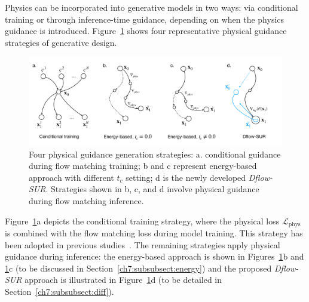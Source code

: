 Physics can be incorporated into generative models in two ways: via conditional training or through inference-time guidance, depending on when the physics guidance is introduced. Figure~\ref{ch7:fig:fmStrategy} shows four representative physical guidance strategies of generative design.  
\begin{figure}[htbp]
    \centering
    \includegraphics[width=1.0\linewidth]{chapter7/fig/Gen_paper.pdf}
    \caption{Four physical guidance generation strategies: a. conditional guidance during flow matching training; b and c represent energy-based approach with different $t_c$ setting; d is the newly developed \textit{Dflow-SUR}. Strategies shown in b, c, and d involve physical guidance during flow matching inference.}
    \label{ch7:fig:fmStrategy}
\end{figure}
Figure~\ref{ch7:fig:fmStrategy}a depicts the conditional training strategy, where the physical loss $\mathcal{L}_{\mathrm{phys}}$ is combined with the flow matching loss during model training. This strategy has been adopted in previous studies~\cite{aa.Lu2023,aa.Yang2024}. The remaining strategies apply physical guidance during inference: the energy-based approach is shown in Figures~\ref{ch7:fig:fmStrategy}b and \ref{ch7:fig:fmStrategy}c (to be discussed in Section~\ref{ch7:subsubsect:energy}) and the proposed \textit{Dflow-SUR} approach is illustrated in Figure~\ref{ch7:fig:fmStrategy}d (to be detailed in Section~\ref{ch7:subsubsect:diff}).


